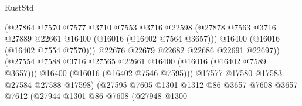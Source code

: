 \begin{lexlean}{RustStd}
\begin{coremodule}
                                            (@27864
                                              @7570
                                              @7577
                                              @3710
                                              @7553
                                              @3716
                                              @22598
                                              (@27878
                                                @7563
                                                @3716
                                                @27889
                                                @22661
                                                @16400
                                                (@16016 (@16402 @7564 @3657)))
                                              @16400
                                              (@16016 (@16402 @7554 @7570)))
                                            @22676
                                            @22679
                                            @22682
                                            @22686
                                            @22691
                                            @22697))
                                        (@27554
                                          @7588
                                          @3716
                                          @27565
                                          @22661
                                          @16400
                                          (@16016 (@16402 @7589 @3657)))
                                        @16400
                                        (@16016 (@16402 @7546 @7595)))
                                      @17577
                                      @17580
                                      @17583
                                      @27584
                                      @27588
                                      @17598)
                                    (@27595
                                      @7605
                                      @1301
                                      @1312
                                      @86
                                      @3657
                                      @7608
                                      @3657
                                      @7612
                                      (@27944
                                        @1301
                                        @86
                                        @7608
                                        (@27948
                                          @1300

\end{coremodule}
\end{lexlean}

